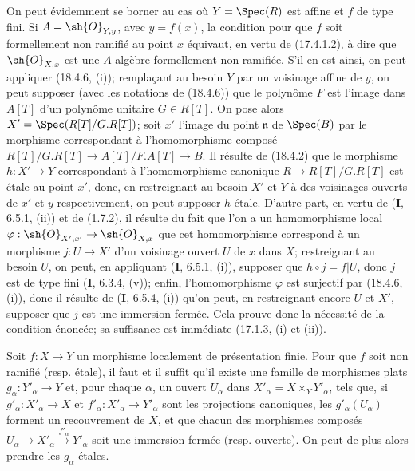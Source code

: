 On peut évidemment se borner au cas où $Y=\Spec(R)$ est affine et $f$ de type fini. Si $A=\sh{O}_{Y,y}$, avec $y=f(x)$, la condition pour que $f$ soit formellement non ramifié au point $x$ équivaut, en vertu de (17.4.1.2), à dire que $\sh{O}_{X,x}$ est une $A$-algèbre formellement non ramifiée. S'il en est ainsi, on peut appliquer (18.4.6, (i)); remplaçant au besoin $Y$ par un voisinage affine de $y$, on peut supposer (avec les notations de (18.4.6)) que le polynôme $F$ est l'image dans $A[T]$ d'un polynôme unitaire $G\in R[T]$. On pose alors $X'=\Spec(R[T]/G.R[T])$; soit $x'$ l'image du point $\mathfrak n$ de $\Spec(B)$ par le morphisme correspondant à l'homomorphisme composé $R[T]/G.R[T]\to A[T]/F.A[T]\to B$. Il résulte de (18.4.2) que le morphisme $h:X'\to Y$ correspondant à l'homomorphisme canonique $R\to R[T]/G.R[T]$ est étale au point $x'$, donc, en restreignant au besoin $X'$ et $Y$ à des voisinages ouverts de $x'$ et $y$ respectivement, on peut supposer $h$ étale. D'autre part, en vertu de (\textbf{I}, 6.5.1, (ii)) et de (1.7.2), il résulte du fait que l'on a un homomorphisme local $\varphi:\sh{O}_{X',x'}\to\sh{O}_{X,x}$ que cet homomorphisme correspond à un morphisme
$j:U\to X'$ d'un voisinage ouvert $U$ de $x$ dans $X$; restreignant au besoin $U$, on peut, en appliquant (\textbf{I}, 6.5.1, (i)), supposer que $h\circ j=f|U$, donc $j$ est de type fini (\textbf{I}, 6.3.4, (v)); enfin, l'homomorphisme $\varphi$ est surjectif par (18.4.6, (i)), donc il résulte de (\textbf{I}, 6.5.4, (i)) qu'on peut, en restreignant encore $U$ et $X'$, supposer que $j$ est une immersion fermée. Cela prouve donc la nécessité de la condition énoncée; sa suffisance est immédiate (17.1.3, (i) et (ii)).

\begin{corollary}[18.4.8]
\label{IV.18.4.8}
Soit $f:X\to Y$ un morphisme localement de présentation finie. Pour que $f$ soit non ramifié \textup{(resp.} étale\textup{)}, il faut et il suffit qu'il existe une famille de morphismes plats $g_\alpha:Y'_\alpha\to Y$ et, pour chaque $\alpha$, un ouvert $U_\alpha$ dans $X'_\alpha=X\times_Y Y'_\alpha$, tels que, si $g'_\alpha:X'_\alpha\to X$ et $f'_\alpha:X'_\alpha\to Y'_\alpha$ sont les projections canoniques, les $g'_\alpha(U_\alpha)$ forment un recouvrement de $X$, et que chacun des morphismes composés $U_\alpha\to X'_\alpha\xrightarrow{f'_\alpha}Y'_\alpha$ soit une immersion fermée \textup{(resp.} ouverte\textup{)}. On peut de plus alors prendre les $g_\alpha$ étales.
\end{corollary}

